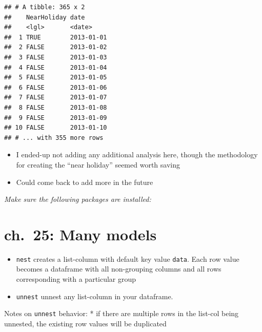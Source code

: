 \documentclass[]{book}
\newenvironment{Shaded}{\begin{snugshade}}{\end{snugshade}}
\newcommand{\KeywordTok}[1]{\textcolor[rgb]{0.13,0.29,0.53}{\textbf{#1}}}
\newcommand{\NormalTok}[1]{#1}
\newcommand{\OperatorTok}[1]{\textcolor[rgb]{0.81,0.36,0.00}{\textbf{#1}}}
\newcommand{\StringTok}[1]{\textcolor[rgb]{0.31,0.60,0.02}{#1}}
\providecommand{\tightlist}{%
  \setlength{\itemsep}{0pt}\setlength{\parskip}{0pt}}
\theoremstyle{definition}
\theoremstyle{definition}
\theoremstyle{definition}
\theoremstyle{remark}
\begin{document}
\begin{verbatim}
## # A tibble: 365 x 2
##    NearHoliday date      
##    <lgl>       <date>    
##  1 TRUE        2013-01-01
##  2 FALSE       2013-01-02
##  3 FALSE       2013-01-03
##  4 FALSE       2013-01-04
##  5 FALSE       2013-01-05
##  6 FALSE       2013-01-06
##  7 FALSE       2013-01-07
##  8 FALSE       2013-01-08
##  9 FALSE       2013-01-09
## 10 FALSE       2013-01-10
## # ... with 355 more rows
\end{verbatim}

\begin{itemize}
\tightlist
\item
  I ended-up not adding any additional analysis here, though the
  methodology for creating the ``near holiday'' seemed worth saving
\item
  Could come back to add more in the future
\end{itemize}

\emph{Make sure the following packages are installed:}

\hypertarget{ch.-25-many-models}{%
\chapter{ch.~25: Many models}\label{ch.-25-many-models}}

\begin{itemize}
\tightlist
\item
  \texttt{nest} creates a list-column with default key value
  \texttt{data}. Each row value becomes a dataframe with all
  non-grouping columns and all rows corresponding with a particular
  group
\end{itemize}

\begin{Shaded}
\end{Shaded}

\begin{itemize}
\tightlist
\item
  \texttt{unnest} unnest any list-column in your dataframe.
\end{itemize}

Notes on \texttt{unnest} behavior: * if there are multiple rows in the
list-col being unnested, the existing row values will be duplicated
\end{document}

